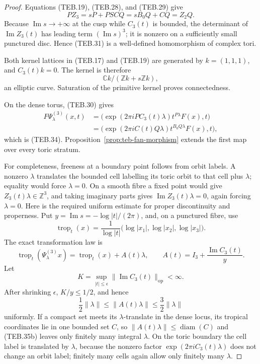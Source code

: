 \begin{proof}
Equations (TEB.19), (TEB.28), and (TEB.29) give
\[
 PZ_3=sP+PSCQ=sB_0Q+CQ=Z_2Q.
\]
Because \(\operatorname{Im}s\to+\infty\) at the cusp while \(C_3(t)\) is
bounded, the determinant of \(\operatorname{Im}Z_3(t)\) has leading term
\((\operatorname{Im}s)^3\); it is nonzero on a sufficiently small punctured
disc.  Hence (TEB.31) is a well-defined homomorphism of complex tori.

Both kernel lattices in (TEB.17) and (TEB.19) are generated by
\(k=(1,1,1)\), and \(C_3(t)k=0\).  The kernel is therefore
\[
 \mathbb C k/(\mathbb Z k+s\mathbb Z k),
\]
an elliptic curve.  Saturation of the primitive kernel proves connectedness.

On the dense torus, (TEB.30) gives
\[
\begin{aligned}
 F\Psi^{(3)}_\lambda(x,t)
 &=\bigl(\exp(2\pi iPC_3(t)\lambda)t^{P\lambda}F(x),t\bigr)\\
 &=\bigl(\exp(2\pi iC(t)Q\lambda)t^{B_0Q\lambda}F(x),t\bigr),
\end{aligned}
\]
which is (TEB.34).  Proposition~\ref{prop:teb-fan-morphism} extends the first
map over every toric stratum.

For completeness, freeness at a boundary point follows from orbit labels.  A
nonzero \(\lambda\) translates the bounded cell labelling its toric orbit to
that cell plus \(\lambda\); equality would force \(\lambda=0\).  On a smooth
fibre a fixed point would give
\(Z_3(t)\lambda\in\mathbb Z^3\), and taking imaginary parts gives
\(\operatorname{Im}Z_3(t)\lambda=0\), again forcing \(\lambda=0\).
Here is the required uniform estimate for proper discontinuity and
properness.  Put \(y=\operatorname{Im}s=-\log|t|/(2\pi)\), and, on a
punctured fibre, use
\[
 \operatorname{trop}_t(x)
 =\frac{1}{\log|t|}
   \bigl(\log|x_1|,\log|x_2|,\log|x_3|\bigr).
\]
The exact transformation law is
\[
 \operatorname{trop}_t(\Psi^{(3)}_\lambda x)
 =\operatorname{trop}_t(x)+A(t)\lambda,\qquad
 A(t)=I_3+\frac{\operatorname{Im}C_3(t)}{y}.           \tag{TEB.35a}
\]
Let
\[
 K=\sup_{|t|\leq\epsilon}
   \|\operatorname{Im}C_3(t)\|_{\mathrm{op}}<\infty.
\]
After shrinking \(\epsilon\), \(K/y\leq1/2\), and hence
\[
 \frac12\|\lambda\|
 \leq\|A(t)\lambda\|
 \leq\frac32\|\lambda\|                               \tag{TEB.35b}
\]
uniformly.  If a compact set meets its \(\lambda\)-translate in the dense
locus, its tropical coordinates lie in one bounded set \(C\), so
\(\|A(t)\lambda\|\leq\operatorname{diam}(C)\) and (TEB.35b) leaves only
finitely many integral \(\lambda\).  On the toric boundary the cell label is
translated by \(\lambda\), because the nonzero factor
\(\exp(2\pi iC_3(t)\lambda)\) does not change an orbit label; finitely many
cells again allow only finitely many \(\lambda\).


\end{proof}

